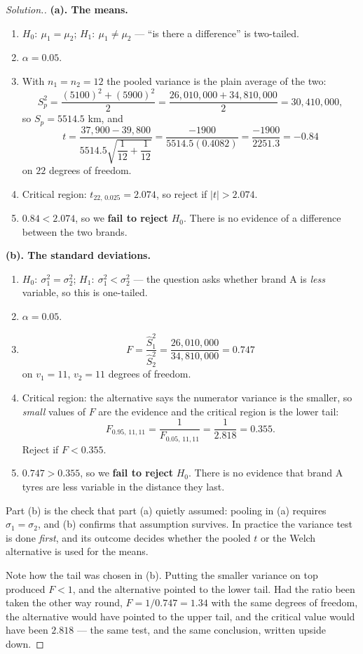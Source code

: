 \documentclass[11pt,a4paper]{article}
\theoremstyle{definition}
\newenvironment{solution}
  {\renewcommand{\qedsymbol}{}\begin{proof}[\textit{Solution}.]}
  {\end{proof}}
\begin{document}
\begin{solution}
\textbf{(a). The means.}
\begin{enumerate}
\item $H_0:\ \mu_1=\mu_2$; $H_1:\ \mu_1\neq\mu_2$ --- ``is there a difference'' is
two-tailed.
\item $\alpha=0.05$.
\item With $n_1=n_2=12$ the pooled variance is the plain average of the two:
\[S_p^2=\frac{(5100)^2+(5900)^2}{2}=\frac{26{,}010{,}000+34{,}810{,}000}{2}=30{,}410{,}000,\]
so $S_p=5514.5$ km, and
\[t=\frac{37{,}900-39{,}800}{5514.5\sqrt{\dfrac{1}{12}+\dfrac{1}{12}}}
=\frac{-1900}{5514.5(0.4082)}=\frac{-1900}{2251.3}=-0.84\]
on $22$ degrees of freedom.
\item Critical region: $t_{22,\,0.025}=2.074$, so reject if $|t|>2.074$.
\item $0.84<2.074$, so we \textbf{fail to reject} $H_0$. There is no evidence of a
difference between the two brands.
\end{enumerate}

\textbf{(b). The standard deviations.}
\begin{enumerate}
\item $H_0:\ \sigma_1^2=\sigma_2^2$; $H_1:\ \sigma_1^2<\sigma_2^2$ --- the question asks
whether brand A is \emph{less} variable, so this is one-tailed.
\item $\alpha=0.05$.
\item
\[F=\frac{\hat{S}_1^2}{\hat{S}_2^2}=\frac{26{,}010{,}000}{34{,}810{,}000}=0.747\]
on $v_1=11$, $v_2=11$ degrees of freedom.
\item Critical region: the alternative says the numerator variance is the smaller, so
\emph{small} values of $F$ are the evidence and the critical region is the lower tail:
\[F_{0.95,\,11,11}=\frac{1}{F_{0.05,\,11,11}}=\frac{1}{2.818}=0.355.\]
Reject if $F<0.355$.
\item $0.747>0.355$, so we \textbf{fail to reject} $H_0$. There is no evidence that brand A
tyres are less variable in the distance they last.
\end{enumerate}

Part (b) is the check that part (a) quietly assumed: pooling in (a) requires
$\sigma_1=\sigma_2$, and (b) confirms that assumption survives. In practice the
variance test is done \emph{first}, and its outcome decides whether the pooled $t$ or the
Welch alternative is used for the means.

Note how the tail was chosen in (b). Putting the smaller variance on top produced $F<1$, and
the alternative pointed to the lower tail. Had the ratio been taken the other way round,
$F=1/0.747=1.34$ with the same degrees of freedom, the alternative would have pointed to the
upper tail, and the critical value would have been $2.818$ --- the same test, and the same
conclusion, written upside down.
\end{solution}
\end{document}

